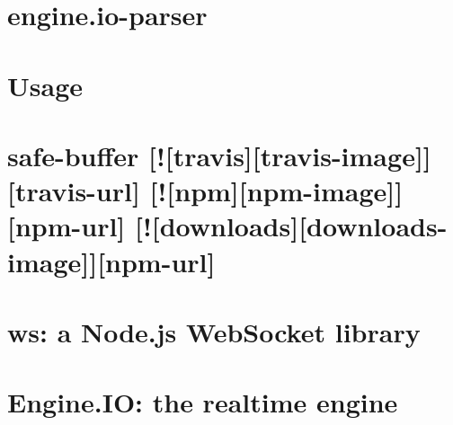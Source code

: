 \documentclass[twoside]{book}
\newcommand{\+}{\discretionary{\mbox{\scriptsize$\hookleftarrow$}}{}{}}
\begin{document}
\chapter{engine.\+io-\/parser}
\label{md_bin_node_modules_socket_8io_node_modules_engine_8io_node_modules_engine_8io-parser__readme}

\chapter{Usage}
\label{md_bin_node_modules_socket_8io_node_modules_engine_8io_node_modules_uws__r_e_a_d_m_e}

\chapter{safe-\/buffer \mbox{[}!\mbox{[}travis\mbox{]}\mbox{[}travis-\/image\mbox{]}\mbox{]}\mbox{[}travis-\/url\mbox{]} \mbox{[}!\mbox{[}npm\mbox{]}\mbox{[}npm-\/image\mbox{]}\mbox{]}\mbox{[}npm-\/url\mbox{]} \mbox{[}!\mbox{[}downloads\mbox{]}\mbox{[}downloads-\/image\mbox{]}\mbox{]}\mbox{[}npm-\/url\mbox{]}}
\label{md_bin_node_modules_socket_8io_node_modules_engine_8io_node_modules_ws_node_modules_safe-buffer__r_e_a_d_m_e}

\chapter{ws\+: a Node.\+js Web\+Socket library}
\label{md_bin_node_modules_socket_8io_node_modules_engine_8io_node_modules_ws__r_e_a_d_m_e}

\chapter{Engine.\+IO\+: the realtime engine}
\label{md_bin_node_modules_socket_8io_node_modules_engine_8io__r_e_a_d_m_e}

\end{document}

